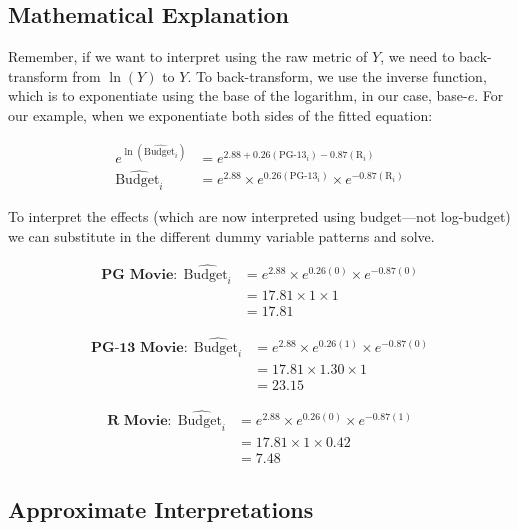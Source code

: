 \documentclass[]{book}
\begin{document}
\hypertarget{mathematical-explanation-1}{%
\subsection{Mathematical Explanation}\label{mathematical-explanation-1}}

Remember, if we want to interpret using the raw metric of \(Y\), we need to back-transform from \(\ln(Y)\) to \(Y\). To back-transform, we use the inverse function, which is to exponentiate using the base of the logarithm, in our case, base-\(e\). For our example, when we exponentiate both sides of the fitted equation:

\[
\begin{split}
e^{\ln\left(\hat{\mathrm{Budget}_i}\right)} &= e^{2.88 + 0.26(\mathrm{PG\mbox{-}13}_i) - 0.87(\mathrm{R}_i)} \\
\hat{\mathrm{Budget}_i} &= e^{2.88} \times e^{0.26(\mathrm{PG\mbox{-}13}_i)} \times e^{-0.87(\mathrm{R}_i)}
\end{split}
\]

To interpret the effects (which are now interpreted using budget---not log-budget) we can substitute in the different dummy variable patterns and solve.

\[
\begin{split}
\textbf{PG Movie:}~~ \hat{\mathrm{Budget}_i} &= e^{2.88} \times e^{0.26(0)} \times e^{-0.87(0)}\\
&= 17.81 \times 1 \times 1 \\
&= 17.81
\end{split}
\]

\[
\begin{split}
\textbf{PG-13 Movie:}~~ \hat{\mathrm{Budget}_i} &= e^{2.88} \times e^{0.26(1)} \times e^{-0.87(0)}\\
&= 17.81 \times 1.30 \times 1 \\
&= 23.15
\end{split}
\]

\[
\begin{split}
\textbf{R Movie:}~~ \hat{\mathrm{Budget}_i} &= e^{2.88} \times e^{0.26(0)} \times e^{-0.87(1)}\\
&= 17.81 \times 1 \times 0.42 \\
&= 7.48
\end{split}
\]

\hypertarget{approximate-interpretations}{%
\subsection{Approximate Interpretations}\label{approximate-interpretations}}
\end{document}
